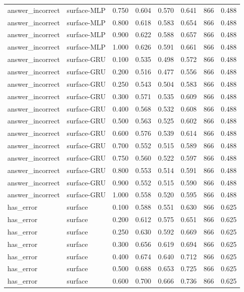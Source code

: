 \begin{tabular}{llrrrrrr}
answer_incorrect & surface-MLP & 0.750 & 0.604 & 0.570 & 0.641 & 866 & 0.488 \\
answer_incorrect & surface-MLP & 0.800 & 0.618 & 0.583 & 0.654 & 866 & 0.488 \\
answer_incorrect & surface-MLP & 0.900 & 0.622 & 0.588 & 0.657 & 866 & 0.488 \\
answer_incorrect & surface-MLP & 1.000 & 0.626 & 0.591 & 0.661 & 866 & 0.488 \\
answer_incorrect & surface-GRU & 0.100 & 0.535 & 0.498 & 0.572 & 866 & 0.488 \\
answer_incorrect & surface-GRU & 0.200 & 0.516 & 0.477 & 0.556 & 866 & 0.488 \\
answer_incorrect & surface-GRU & 0.250 & 0.543 & 0.504 & 0.583 & 866 & 0.488 \\
answer_incorrect & surface-GRU & 0.300 & 0.571 & 0.535 & 0.609 & 866 & 0.488 \\
answer_incorrect & surface-GRU & 0.400 & 0.568 & 0.532 & 0.608 & 866 & 0.488 \\
answer_incorrect & surface-GRU & 0.500 & 0.563 & 0.525 & 0.602 & 866 & 0.488 \\
answer_incorrect & surface-GRU & 0.600 & 0.576 & 0.539 & 0.614 & 866 & 0.488 \\
answer_incorrect & surface-GRU & 0.700 & 0.552 & 0.515 & 0.589 & 866 & 0.488 \\
answer_incorrect & surface-GRU & 0.750 & 0.560 & 0.522 & 0.597 & 866 & 0.488 \\
answer_incorrect & surface-GRU & 0.800 & 0.553 & 0.514 & 0.591 & 866 & 0.488 \\
answer_incorrect & surface-GRU & 0.900 & 0.552 & 0.515 & 0.590 & 866 & 0.488 \\
answer_incorrect & surface-GRU & 1.000 & 0.558 & 0.520 & 0.595 & 866 & 0.488 \\
has_error & surface & 0.100 & 0.588 & 0.551 & 0.630 & 866 & 0.625 \\
has_error & surface & 0.200 & 0.612 & 0.575 & 0.651 & 866 & 0.625 \\
has_error & surface & 0.250 & 0.630 & 0.592 & 0.669 & 866 & 0.625 \\
has_error & surface & 0.300 & 0.656 & 0.619 & 0.694 & 866 & 0.625 \\
has_error & surface & 0.400 & 0.674 & 0.640 & 0.712 & 866 & 0.625 \\
has_error & surface & 0.500 & 0.688 & 0.653 & 0.725 & 866 & 0.625 \\
has_error & surface & 0.600 & 0.700 & 0.666 & 0.736 & 866 & 0.625 \\

\end{tabular}
